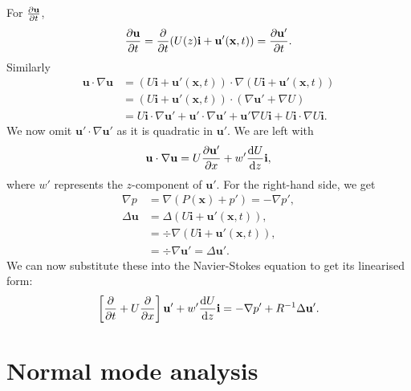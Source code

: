 For $ \pdv{\mathbf{u}}{t} $, 
\begin{equation}
    \pdv{\mathbf{u}}{t} = \pdv{t} (U(z) \mathbf{i} + \mathbf{u}'(\mathbf{x}, t)) = \pdv{\mathbf{u}'}{t}.
\end{equation}
Similarly
\begin{align}
    \mathbf{u} \cdot \nabla \mathbf{u} &= (U \mathbf{i} + \mathbf{u}' (\mathbf{x}, t)) \cdot \nabla (U \mathbf{i} + \mathbf{u}' (\mathbf{x}, t)) \nonumber\\
    &= (U \mathbf{i} + \mathbf{u}' (\mathbf{x}, t)) \cdot (\nabla \mathbf{u}' + \nabla U) \nonumber\\
    &= U \mathbf{i} \cdot \nabla \mathbf{u}' + \mathbf{u}' \cdot \nabla \mathbf{u}' + \mathbf{u}' \nabla U \mathbf{i} + U \mathbf{i} \cdot \nabla U \mathbf{i}.
\end{align}
We now omit $ \mathbf{u}' \cdot \nabla \mathbf{u}' $ as it is quadratic in $ \mathbf{u}' $. We are left with
\begin{equation}
    \mathbf{u} \cdot \nabla \mathbf{u} = U \pdv{\mathbf{u}'}{x} + w' \frac{\text{d}U}{\text{d}z} \mathbf{i},
\end{equation}
where $ w' $ represents the $ z$-component of $ \mathbf{u}'$. For the right-hand side, we get
\begin{align}
    \nabla p &= \nabla (P(\mathbf{x}) + p') = -\nabla p', \nonumber\\
    \Delta \mathbf{u} &= \Delta (U \mathbf{i} + \mathbf{u}' (\mathbf{x}, t)), \nonumber\\
    &= \div{\nabla (U \mathbf{i} + \mathbf{u}' (\mathbf{x}, t))}, \nonumber\\
    &= \div{\nabla \mathbf{u}'} = \Delta \mathbf{u}'.
\end{align}
We can now substitute these into the Navier-Stokes equation to get its linearised form:
\begin{equation}
    \left[\pdv{t} + U \pdv{}{x}\right] \mathbf{u}' + w' \frac{\text{d}U}{\text{d}z} \mathbf{i} = - \nabla p' + R^{-1} \Delta \mathbf{u}'.
\label{nslin}
\end{equation}

\section{Normal mode analysis}


